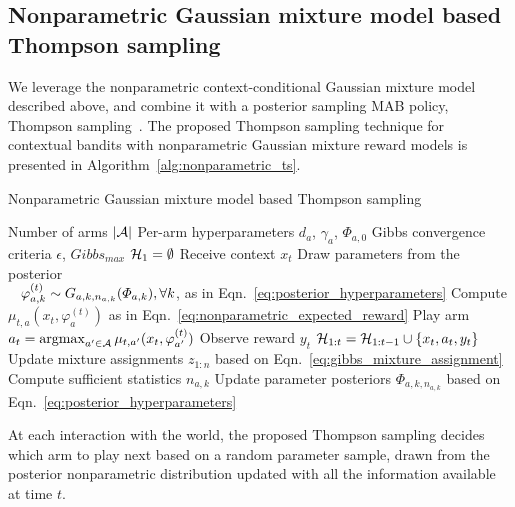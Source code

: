 \subsection{Nonparametric Gaussian mixture model based Thompson sampling}
\label{ssec:nonparametric_thompson_sampling}

We leverage the nonparametric context-conditional Gaussian mixture model described above, and combine it with a posterior sampling MAB policy, \ie Thompson sampling~\citep{j-Russo2018}. The proposed Thompson sampling technique for contextual bandits with nonparametric Gaussian mixture reward models is presented in Algorithm~\ref{alg:nonparametric_ts}.

\vspace*{-2ex}
\begin{algorithm}
	\caption{Nonparametric Gaussian mixture model based Thompson sampling}
	\label{alg:nonparametric_ts}
	\begin{algorithmic}[1]
		 Number of arms $|\mathcal{A}|$
		 Per-arm hyperparameters $d_a$, $\gamma_a$, $\varPhi_{a,0}$
		 Gibbs convergence criteria $\epsilon$, $Gibbs_{max}$ 
		\STATE $\mathcal{H}_1=\emptyset$
		\STATE Receive context $x_{t}$
		\STATE Draw parameters from the posterior \\ $\hspace*{2ex}\varphi_{a,k}^{(t)} \sim G_{a,k,n_{a,k}}(\varPhi_{a,k}), \forall k$, as in Eqn.~\eqref{eq:posterior_hyperparameters}
		\STATE Compute $\mu_{t,a}(x_{t},\varphi_{a}^{(t)})$ as in Eqn.~\eqref{eq:nonparametric_expected_reward}
		\ENDFOR
		\STATE Play arm $a_{t}=\mathop{\mathrm{argmax}}_{a^\prime \in \mathcal{A}} \mu_{t,a^\prime}(x_{t},\varphi_{a^\prime}^{(t)})$
		\STATE Observe reward $y_{t}$
		\STATE $\mathcal{H}_{1:t}=\mathcal{H}_{1:t-1} \cup \left\{x_{t}, a_{t}, y_{t}\right\}$
		\STATE Update mixture assignments $z_{1:n}$ based on Eqn.~\eqref{eq:gibbs_mixture_assignment}
		\STATE Compute sufficient statistics $n_{a,k}$
		\STATE Update parameter posteriors $\varPhi_{a,k,n_{a,k}}$ based on Eqn.~\eqref{eq:posterior_hyperparameters}
		\ENDWHILE
		\ENDFOR
	\end{algorithmic}
\end{algorithm}
\vspace*{-2ex}

At each interaction with the world, the proposed Thompson sampling decides which arm to play next based on a random parameter sample, drawn from the posterior nonparametric distribution updated with all the information available at time $t$.

